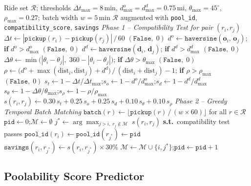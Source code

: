 \documentclass[a4paper,fleqn]{cas-dc}
\begin{document}
\begin{algorithm}[t]
\caption{Multi-Criteria Ride Pooling (Compatibility Test and Greedy Matching)}
\label{alg:ride_pool}
\begin{algorithmic}[1]
\Require Ride set $\mathcal{R}$; thresholds $\Delta t_{\max}{=}8$\,min, $d^o_{\max}{=}d^d_{\max}{=}0.75$\,mi, $\theta_{\max}{=}45^\circ$, $\rho_{\max}{=}0.27$; batch width $w{=}5$\,min
\Ensure $\mathcal{R}$ augmented with \texttt{pool\_id}, \texttt{compatibility\_score}, \texttt{savings}
\Statex \textit{Phase 1 -- Compatibility Test for pair $(r_i, r_j)$}
\State $\Delta t \gets |\texttt{pickup}(r_i) - \texttt{pickup}(r_j)|\,/\,60$
 \Return $(\mathtt{False},\;0)$ \EndIf
\State $d^o \gets \texttt{haversine}(\mathbf{o}_i,\,\mathbf{o}_j)$; \textbf{if} $d^o > d^o_{\max}$ \Return $(\mathtt{False},\;0)$
\State $d^d \gets \texttt{haversine}(\mathbf{d}_i,\,\mathbf{d}_j)$; \textbf{if} $d^d > d^d_{\max}$ \Return $(\mathtt{False},\;0)$
\State $\Delta\theta \gets \min\bigl(|\theta_i-\theta_j|,\;360-|\theta_i-\theta_j|\bigr)$; \textbf{if} $\Delta\theta > \theta_{\max}$ \Return $(\mathtt{False},\;0)$
\State $\rho \gets \bigl(d^o + \max(\mathrm{dist}_i, \mathrm{dist}_j) + d^d\bigr)\,/\,(\mathrm{dist}_i + \mathrm{dist}_j) - 1$; \textbf{if} $\rho > \rho_{\max}$ \Return $(\mathtt{False},\;0)$
\State $s_t \gets 1-\Delta t/\Delta t_{\max}$;\enspace $s_o \gets 1-d^o/d^o_{\max}$;\enspace $s_d \gets 1-d^d/d^d_{\max}$
\State $s_\theta \gets 1-\Delta\theta/\theta_{\max}$;\enspace $s_\rho \gets 1-\rho/\rho_{\max}$
\State $s(r_i,r_j) \gets 0.30\,s_t + 0.25\,s_o + 0.25\,s_d + 0.10\,s_\theta + 0.10\,s_\rho$
\Statex \textit{Phase 2 -- Greedy Temporal Batch Matching}
\State $\texttt{batch}(r) \gets \lfloor\texttt{pickup}(r)\,/\,(w\!\times\!60)\rfloor$ \; for all $r\in\mathcal{R}$
\State $\texttt{pid} \gets 0$;\quad $\mathcal{M} \gets \emptyset$
    \State $j^* \gets \arg\max_{j>i,\;r_j\notin\mathcal{M}}\;s(r_i,r_j)$ \textbf{s.t.}\ compatibility test passes
      \State $\texttt{pool\_id}(r_i)\gets\texttt{pool\_id}(r_{j^*})\gets\texttt{pid}$
      \State $\texttt{savings}(r_i,r_{j^*})\gets s(r_i,r_{j^*})\times 30\%$
      \State $\mathcal{M}\gets\mathcal{M}\cup\{i,j^*\}$;\quad $\texttt{pid}\gets\texttt{pid}+1$
    \EndIf
  \EndFor
\EndFor
\end{algorithmic}
\end{algorithm}

\subsection{Poolability Score Predictor}
\label{sec:poolability}
\end{document}
